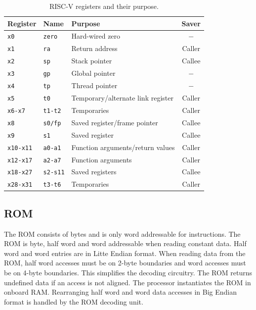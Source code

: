 \documentclass[12pt]{article}
\begin{document}
\begin{table}[!ht]
\centering
\caption{RISC-V registers and their purpose.}
\label{tab:registers}
\begin{tabular}{lllc}
Register & Name & Purpose & Saver \\
\midrule
\texttt{x0}      & \texttt{zero}   & Hard-wired zero                   & $-$ \\
\texttt{x1}      & \texttt{ra}     & Return address                    & Caller \\
\texttt{x2}      & \texttt{sp}     & Stack pointer                     & Callee \\
\texttt{x3}      & \texttt{gp}     & Global pointer                    & $-$ \\
\texttt{x4}      & \texttt{tp}     & Thread pointer                    & $-$ \\
\texttt{x5}      & \texttt{t0}     & Temporary/alternate link register & Caller \\
\texttt{x6-x7}   & \texttt{t1-t2}  & Temporaries                       & Caller \\
\texttt{x8}      & \texttt{s0/fp}  & Saved register/frame pointer      & Callee \\
\texttt{x9}      & \texttt{s1}     & Saved register                    & Callee \\
\texttt{x10-x11} & \texttt{a0-a1}  & Function arguments/return values  & Caller \\
\texttt{x12-x17} & \texttt{a2-a7}  & Function arguments                & Caller \\
\texttt{x18-x27} & \texttt{s2-s11} & Saved registers                   & Callee \\
\texttt{x28-x31} & \texttt{t3-t6}  & Temporaries                       & Caller
\end{tabular}
\end{table}

\subsection{ROM}
\label{sec:rom}
The ROM consists of bytes and is only word addressable for instructions. The ROM is byte, half word and word addressable when reading constant data. Half word and word entries are in Litte Endian format. When reading data from the ROM, half word accesses must be on 2-byte boundaries and word accesses must be on 4-byte boundaries. This simplifies the decoding circuitry. The ROM returns undefined data if an access is not aligned. The processor instantiates the ROM in onboard RAM. Rearranging half word and word data accesses in Big Endian format is handled by the ROM decoding unit.
\end{document}
